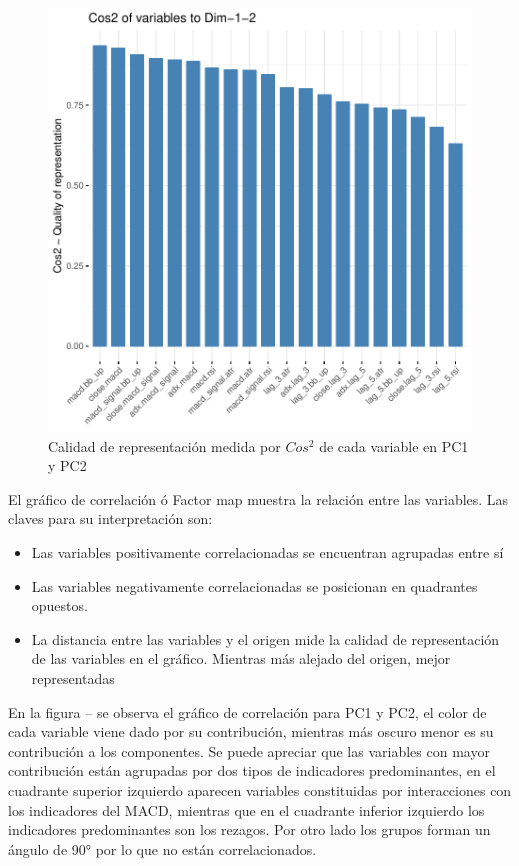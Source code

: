 \documentclass[a4paper,12pt]{Latex/Classes/PhDthesisPSnPDF}
\begin{document}
\begin{figure}[H]
\centering
\includegraphics{main-010}
\caption{Calidad de representación medida por $Cos^2$ de cada variable en PC1 y PC2}
\end{figure}

El gráfico de correlación ó Factor map muestra la relación entre las variables. Las claves para su interpretación son:

\begin{itemize}
\item Las variables positivamente correlacionadas se encuentran agrupadas entre sí
\item Las variables negativamente correlacionadas se posicionan en quadrantes opuestos.
\item La distancia entre las variables y el origen mide la calidad de representación de las variables en el gráfico. Mientras más alejado del origen, mejor representadas 
\end{itemize}

En la figura -- se observa el gráfico de correlación para PC1 y PC2, el color de cada variable viene dado por su contribución, mientras más oscuro menor es su contribución a los componentes. Se puede apreciar que las variables con mayor contribución están agrupadas por dos tipos de indicadores predominantes, en el cuadrante superior izquierdo aparecen variables constituidas por interacciones con los indicadores del MACD, mientras que en el cuadrante inferior izquierdo los indicadores predominantes son los rezagos. Por otro lado los grupos forman un ángulo de 90° por lo que no están correlacionados.
\end{document}
